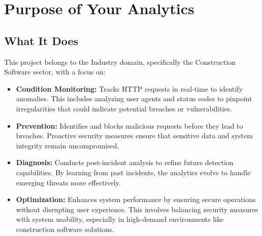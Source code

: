 %
%

\chapter{Purpose of Your Analytics}

\section{What It Does}

This project belongs to the Industry domain, specifically the Construction Software sector, with a focus on:

\begin{itemize}
	\item \textbf{Condition Monitoring:} Tracks HTTP requests in real-time to identify anomalies. This includes analyzing user agents and status codes to pinpoint irregularities that could indicate potential breaches or vulnerabilities.
	\item \textbf{Prevention:} Identifies and blocks malicious requests before they lead to breaches. Proactive security measures ensure that sensitive data and system integrity remain uncompromised.
	\item \textbf{Diagnosis:} Conducts post-incident analysis to refine future detection capabilities. By learning from past incidents, the analytics evolve to handle emerging threats more effectively.
	\item \textbf{Optimization:} Enhances system performance by ensuring secure operations without disrupting user experience. This involves balancing security measures with system usability, especially in high-demand environments like construction software solutions.
\end{itemize}



